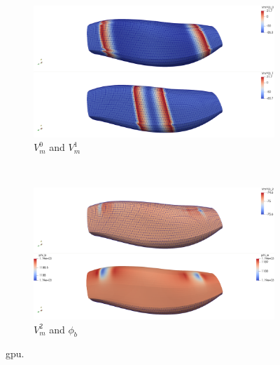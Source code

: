 \begin{figure}[H]
  \centering%
  \begin{subfigure}[t]{\textwidth}%
    \centering%
    \includegraphics[width=\textwidth]{images/results/application/multidomain_Vm0_1.png}%
    \caption{$V_m^0$ and $V_m^1$}%
    \label{fig:16_hodgkin_huxley_gpu}%
  \end{subfigure} \\
  \begin{subfigure}[t]{\textwidth}%
    \centering%
    \includegraphics[width=\textwidth]{images/results/application/multidomain_Vm2_phi_b.png}%
    \caption{$V_m^2$ and $\phi_b$}%
    \label{fig:16_hodgkin_huxley_gpu}%
  \end{subfigure}   
  \caption{gpu.}%
  \label{fig:16_hodgkin_huxley_cpu_gpu}%
\end{figure}%

